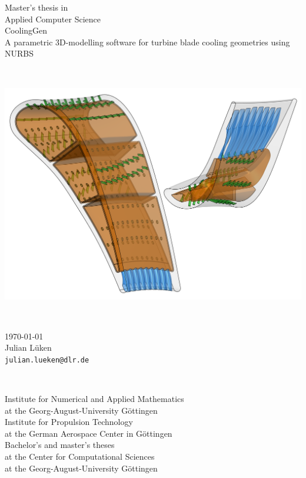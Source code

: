 \documentclass[a4paper, 11pt]{report}
\theoremstyle{definition}
\newcommand{\mytitle}[1]{\LARGE{#1}\normalsize}
\newcommand{\titlespace}{1em}
\newcommand{\largetitlespace}{2.5em}
\newcommand{\titlefigurespace}{3.5em}
\begin{document}
\begin{titlepage}
\begin{center}
		\begin{minipage}{.49\textwidth}
			\begin{center}
				Master's thesis in\\
				Applied Computer Science\\[\titlespace]
				\mytitle{CoolingGen}\\[0.5\titlespace]
				A parametric 3D-modelling software for turbine blade cooling geometries using NURBS
			\end{center}
		\end{minipage}\\[\titlefigurespace]
		\begin{minipage}{.6\textwidth}
			\includegraphics[width=\textwidth]{../tec/complete/title.png}
		\end{minipage}\\[\titlefigurespace]
		\begin{minipage}{.6\textwidth}
			\centering
				\today\\
				Julian Lüken\\
				\texttt{julian.lueken@dlr.de}
		\end{minipage}\\[\largetitlespace]
		\begin{minipage}{.5\textwidth}
			\centering
			Institute for Numerical and Applied Mathematics\\at the Georg-August-University Göttingen\\[\titlespace]
			Institute for Propulsion Technology\\at the German Aerospace Center in Göttingen\\[\titlespace]
			Bachelor's and master's theses\\at the Center for Computational Sciences\\at the Georg-August-University Göttingen\\[\titlespace]

\end{minipage}
\end{center}
\end{titlepage}
\end{document}
